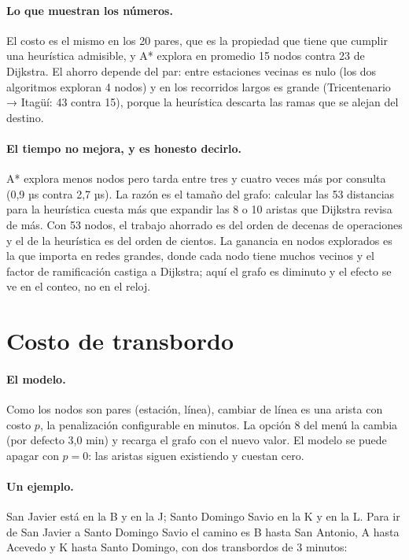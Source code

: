 \documentclass[11pt,a4paper]{article}
\begin{document}
\paragraph{Lo que muestran los números.}
El costo es el mismo en los 20 pares, que es la propiedad que tiene que cumplir
una heurística admisible, y A* explora en promedio 15 nodos contra 23 de
Dijkstra. El ahorro depende del par: entre estaciones vecinas es nulo (los dos
algoritmos exploran 4 nodos) y en los recorridos largos es grande (Tricentenario
→ Itagüí: 43 contra 15), porque la heurística descarta las ramas que se alejan del
destino.

\paragraph{El tiempo no mejora, y es honesto decirlo.}
A* explora menos nodos pero tarda entre tres y cuatro veces más por consulta
(0,9 µs contra 2,7 µs). La razón es el tamaño del grafo: calcular las 53
distancias para la heurística cuesta más que expandir las 8 o 10 aristas que
Dijkstra revisa de más. Con 53 nodos, el trabajo ahorrado es del orden de
decenas de operaciones y el de la heurística es del orden de cientos. La ganancia
en nodos explorados es la que importa en redes grandes, donde cada nodo tiene
muchos vecinos y el factor de ramificación castiga a Dijkstra; aquí el grafo es
diminuto y el efecto se ve en el conteo, no en el reloj.

\section{Costo de transbordo}

\paragraph{El modelo.}
Como los nodos son pares (estación, línea), cambiar de línea es una arista con
costo $p$, la penalización configurable en minutos. La opción 8 del menú la cambia
(por defecto 3,0 min) y recarga el grafo con el nuevo valor. El modelo se puede
apagar con $p = 0$: las aristas siguen existiendo y cuestan cero.

\paragraph{Un ejemplo.}
San Javier está en la B y en la J; Santo Domingo Savio en la K y en la L. Para ir
de San Javier a Santo Domingo Savio el camino es B hasta San Antonio, A hasta
Acevedo y K hasta Santo Domingo, con dos transbordos de 3 minutos:
\end{document}

